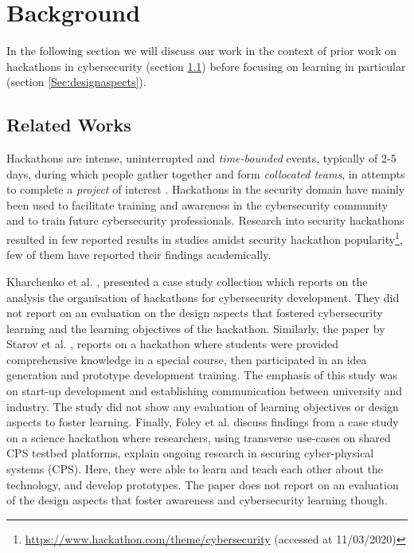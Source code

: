 \documentclass[runningheads]{llncs}
\begin{document}
\section{Background}
In the following section we will discuss our work in the context of prior work on hackathons in cybersecurity (section \ref{Sec:relatedworks}) before focusing on learning in particular (section \ref{Sec:designaspects}).

\subsection{Related Works}\label{Sec:relatedworks}
Hackathons are intense, uninterrupted and \textit{time-bounded} events, typically of 2-5 days, during which people gather together and form \textit{collocated teams}, in attempts to complete a \textit{project} of interest \cite{nolte2018you,komssi2015hackathons}. Hackathons in the security domain have mainly been used to facilitate training and awareness in the cybersecurity community and to train future cybersecurity professionals. Research into security hackathons resulted in few reported results in studies amidst security hackathon popularity\footnote{\url{https://www.hackathon.com/theme/cybersecurity} (accessed at 11/03/2020)}, few of them have reported their findings academically. 

Kharchenko et al. \cite{kharchenko2016university}, presented a case study collection which reports on the analysis the organisation of hackathons for cybersecurity development. 
They did not report on an evaluation on the design aspects that fostered cybersecurity learning and the learning objectives of the hackathon. Similarly, the paper by Starov et al. \cite{starov2015hacking}, reports on a hackathon where students were provided comprehensive knowledge in a special course, then participated in an idea generation and prototype development training.
The emphasis of this study was on start-up development and establishing communication between university and industry. The study did not show any evaluation of learning objectives or design aspects to foster learning. Finally, Foley et al. \cite{foley2018science} discuss findings from a case study on a science hackathon where researchers, using transverse use-cases on shared CPS testbed platforms, explain ongoing research in securing cyber-physical systems (CPS). Here, they were able to learn and teach each other about the technology, and develop prototypes. 
The paper does not report on an evaluation of the design aspects that foster awareness and cybersecurity learning though.
\end{document}
